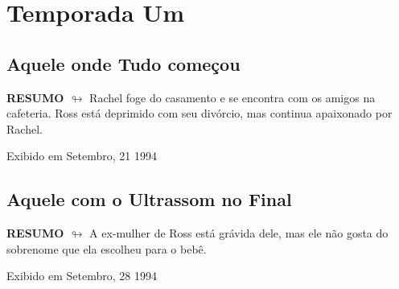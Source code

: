 \part{Temporada Um}

\chapter{Aquele onde Tudo começou}

\textbf{RESUMO $\looparrowright$} Rachel foge do casamento e se encontra com os amigos na cafeteria. Ross está deprimido com seu divórcio, mas continua apaixonado por Rachel.

\begin{flushright}
\textcolor{gray600}{Exibido em Setembro, 21 1994}
\end{flushright}


\chapter{Aquele com o Ultrassom no Final}

\textbf{RESUMO $\looparrowright$} A ex-mulher de Ross está grávida dele, mas ele não gosta do sobrenome que ela escolheu para o bebê.

\begin{flushright}
\textcolor{gray600}{Exibido em Setembro, 28 1994}
\end{flushright}


